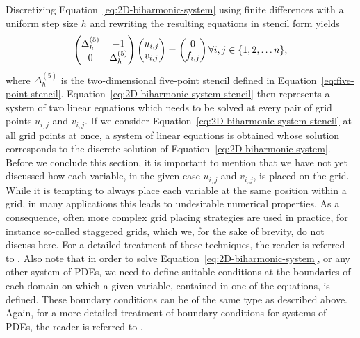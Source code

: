 Discretizing Equation~\eqref{eq:2D-biharmonic-system} using finite differences with a uniform step size $h$ and rewriting the resulting equations in stencil form yields
\begin{equation}
		\begin{pmatrix}
			\Delta_h^{(5)} & -1 \\
			0 & \Delta_h^{(5)}
	\end{pmatrix}
		\begin{pmatrix}
			u_{i,j} \\ v_{i,j}
		\end{pmatrix}
	=
		\begin{pmatrix}
			0 \\ f_{i,j}
		\end{pmatrix} \\
\forall i,j \in \{1, 2, \dots n\},
	\label{eq:2D-biharmonic-system-stencil}
\end{equation}
where $\Delta_h^{(5)}$ is the two-dimensional five-point stencil defined in Equation~\eqref{eq:five-point-stencil}.
Equation~\eqref{eq:2D-biharmonic-system-stencil} then represents a system of two linear equations which needs to be solved at every pair of grid points $u_{i,j}$ and $v_{i,j}$.
If we consider Equation~\eqref{eq:2D-biharmonic-system-stencil} at all grid points at once, a system of linear equations is obtained whose solution corresponds to the discrete solution of Equation~\eqref{eq:2D-biharmonic-system}.
Before we conclude this section, it is important to mention that we have not yet discussed how each variable, in the given case $u_{i,j}$ and $v_{i,j}$, is placed on the grid.
While it is tempting to always place each variable at the same position within a grid, in many applications this leads to undesirable numerical properties.%
As a consequence, often more complex grid placing strategies are used in practice, for instance so-called staggered grids, which we, for the sake of brevity, do not discuss here.
For a detailed treatment of these techniques, the reader is referred to %
.
Also note that in order to solve Equation~\eqref{eq:2D-biharmonic-system}, or any other system of PDEs, we need to define suitable conditions at the boundaries of each domain on which a given variable, contained in one of the equations, is defined.
These boundary conditions can be of the same type as described above.
Again, for a more detailed treatment of boundary conditions for systems of PDEs, the reader is referred to %
.
 


